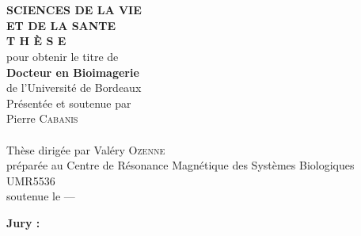 

\begin{titlepage}
\begin{center}
 \\
\vspace*{0.3cm}
 \\
\noindent \textbf{SCIENCES DE LA VIE\\ ET DE LA SANTE} \\
\vspace*{0.5cm}
\noindent \Huge \textbf{T H È S E} \\
\vspace*{0.3cm}
\noindent \large {pour obtenir le titre de} \\
\vspace*{0.3cm}
\noindent \LARGE \textbf{Docteur en Bioimagerie} \\
\vspace*{0.3cm}
\noindent \Large de l'Université de Bordeaux \\
\vspace*{0.4cm}
\noindent \large {Présentée et soutenue par\\}
\noindent \LARGE Pierre \textsc{Cabanis} \\
\vspace*{0.8cm}
 \\
\vspace*{0.8cm}
\noindent \Large Thèse dirigée par Valéry \textsc{Ozenne} \\
\vspace*{0.2cm}
\noindent \Large préparée au Centre de Résonance Magnétique des Systèmes Biologiques
UMR5536 \\
\vspace*{0.2cm}
\noindent \large soutenue le --- \\
\vspace*{0.5cm}
\end{center}
\noindent \large \textbf{Jury :} \\
\begin{center}
\noindent \large 
\begin{tabular}{llcl}

\end{tabular}
\end{center}
\end{titlepage}
